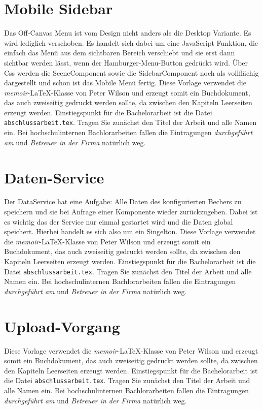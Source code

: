 \section{Mobile Sidebar}
\label{sec:umsetzung}
%
Das Off-Canvas Menu ist vom Design nicht anders als die Desktop Variante. Es wird lediglich verschoben. Es handelt sich dabei um eine JavaScript Funktion, die einfach das Menü aus dem sichtbaren Bereich verschiebt und sie erst dann sichtbar werden lässt, wenn der  Hamburger-Menu-Button gedrückt wird. Über Css werden die SceneComponent sowie die SidebarComponent noch als vollflächig dargestellt und schon ist das Mobile Menü fertig.
Diese Vorlage verwendet die \textit{memoir}-LaTeX-Klasse von Peter Wilson und erzeugt somit ein Buchdokument, das auch zweiseitig gedruckt werden sollte, da zwischen den Kapiteln Leerseiten erzeugt werden. Einstiegspunkt für die Bachelorarbeit ist die Datei \texttt{abschlussarbeit.tex}. Tragen Sie zunächst den Titel der Arbeit und alle Namen ein. Bei hochschulinternen Bachlorarbeiten fallen die Eintragungen \textit{durchgeführt am} und \textit{Betreuer in der Firma} natürlich weg.
%
\section{Daten-Service}
\label{sec:umsetzung}
%
Der DataService hat eine Aufgabe: Alle Daten des konfigurierten Bechers zu speichern und sie bei Anfrage einer Komponente wieder zurückzugeben. Dabei ist es wichtig das der Service nur einmal gestartet wird und die Daten global speichert. Hierbei handelt es sich also um ein Singelton.
Diese Vorlage verwendet die \textit{memoir}-LaTeX-Klasse von Peter Wilson und erzeugt somit ein Buchdokument, das auch zweiseitig gedruckt werden sollte, da zwischen den Kapiteln Leerseiten erzeugt werden. Einstiegspunkt für die Bachelorarbeit ist die Datei \texttt{abschlussarbeit.tex}. Tragen Sie zunächst den Titel der Arbeit und alle Namen ein. Bei hochschulinternen Bachlorarbeiten fallen die Eintragungen \textit{durchgeführt am} und \textit{Betreuer in der Firma} natürlich weg.
%
\section{Upload-Vorgang}
\label{sec:umsetzung}
%
Diese Vorlage verwendet die \textit{memoir}-LaTeX-Klasse von Peter Wilson und erzeugt somit ein Buchdokument, das auch zweiseitig gedruckt werden sollte, da zwischen den Kapiteln Leerseiten erzeugt werden. Einstiegspunkt für die Bachelorarbeit ist die Datei \texttt{abschlussarbeit.tex}. Tragen Sie zunächst den Titel der Arbeit und alle Namen ein. Bei hochschulinternen Bachlorarbeiten fallen die Eintragungen \textit{durchgeführt am} und \textit{Betreuer in der Firma} natürlich weg.